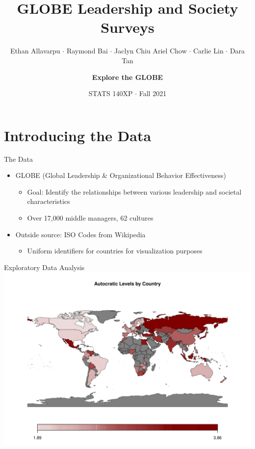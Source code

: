 \documentclass[
  ignorenonframetext,
]{beamer}
\title{GLOBE Leadership and Society Surveys}
\subtitle{Ethan Allavarpu \(\cdot\) Raymond Bai \(\cdot\) Jaclyn Chiu
\newline Ariel Chow \(\cdot\) Carlie Lin \(\cdot\) Dara Tan}
\author{\textbf{Explore the GLOBE}}
\date{STATS 140XP \(\cdot\) Fall 2021}
\providecommand{\tightlist}{%
  \setlength{\itemsep}{0pt}\setlength{\parskip}{0pt}}
\begin{document}
\frame{\titlepage}

\hypertarget{introducing-the-data}{%
\section{Introducing the Data}\label{introducing-the-data}}

\begin{frame}{The Data}
\protect\hypertarget{the-data}{}
\begin{itemize}
\tightlist
\item
  GLOBE (Global Leadership \& Organizational Behavior Effectiveness)

  \begin{itemize}
  \tightlist
  \item
    Goal: Identify the relationships between various leadership and
    societal characteristics
  \item
    Over 17,000 middle managers, 62 cultures
  \end{itemize}
\item
  Outside source: ISO Codes from Wikipedia

  \begin{itemize}
  \tightlist
  \item
    Uniform identifiers for countries for visualization purposes
  \end{itemize}
\end{itemize}
\end{frame}

\begin{frame}{Exploratory Data Analysis}
\protect\hypertarget{exploratory-data-analysis}{}
\includegraphics{final_slides_files/figure-beamer/eda_leader-1.pdf}
\end{frame}
\end{document}
